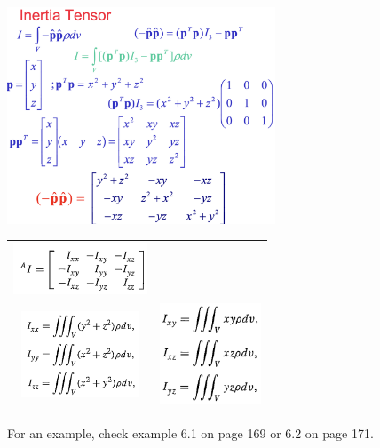 \begin{center}
\begin{minipage}{0.5\textwidth}
	\begin{center}
		\includegraphics[width=8cm]{sections/imgs/6_inertia_tensor.png}
	\end{center}
\end{minipage}
\begin{minipage}{0.49\textwidth}
	\begin{tabular}{cc}
		\includegraphics[width=4cm]{sections/imgs/33.png}&\\
		\includegraphics[width=3.5cm]{sections/imgs/34.png}& \includegraphics[width=3cm]{sections/imgs/35.png}
	\end{tabular}
\end{minipage}
\end{center}

For an example, check example 6.1 on page 169 or 6.2 on page 171.

